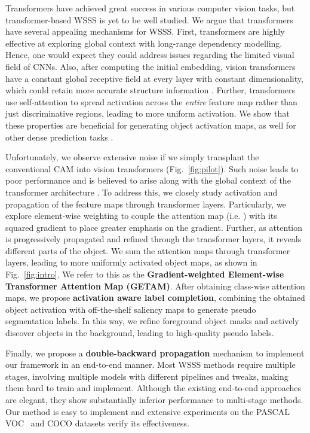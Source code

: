 \documentclass[10pt,twocolumn,letterpaper]{article}
\begin{document}
Transformers \cite{vaswani2017attention} have achieved great success in various computer vision tasks, but transformer-based WSSS is yet to be well studied.
We argue that transformers have several appealing mechanisms for WSSS. 
First, transformers are highly effective at exploring global context with long-range dependency modelling. Hence, one would expect they could address issues regarding the limited visual field of CNNs.
Also, after computing the initial embedding, vision transformers have a constant global receptive field at every layer 
with constant dimensionality, 
which could retain more accurate structure information \cite{ranftl2021vision,mao2021transformer}. Further, transformers use self-attention to spread activation across the \textit{entire} feature map rather than just discriminative regions, leading to more uniform activation.
We show that these properties are beneficial for generating object activation maps, as well for other dense prediction tasks \cite{ranftl2021vision,liu2021swin,bao2021beit,wang2021pvtv2,strudel2021segmenter}. 


Unfortunately, we observe extensive noise if we simply transplant the conventional CAM \cite{zhou2016learning} into vision transformers (Fig.~\ref{fig:pilot}). Such noise leads to poor performance and is
believed
to arise along with the global context of the transformer architecture \cite{zhang2021aggregating}.
To address this, we closely study activation and propagation of the feature maps through transformer layers. Particularly, we explore element-wise weighting to couple the attention map (i.e. ) with its squared gradient
to
place greater emphasis on the gradient. 
Further, as attention is progressively propagated and refined through the transformer layers, it reveals different  parts of the object.
We sum the attention maps through transformer layers, leading to more uniformly activated
object maps, as shown in Fig.~\ref{fig:intro}. We refer to this as the \textbf{Gradient-weighted Element-wise Transformer Attention Map (GETAM)}.
After obtaining class-wise attention maps,
we propose \textbf{activation aware label completion}, combining the obtained object activation with off-the-shelf saliency maps to generate pseudo segmentation labels. 
In this way, we refine foreground object masks and actively discover objects in the background, leading to high-quality pseudo labels.

Finally, we propose a \textbf{double-backward propagation} mechanism to implement our framework in an end-to-end manner. Most WSSS methods require multiple stages, involving multiple models with different pipelines and tweaks, making them hard to train and implement.
Although the existing end-to-end approaches
 \cite{pinheiro2015image,papandreou2015weakly,zeng2019joint,zhang2020reliability,Araslanov_2020_CVPR,zhang2021adaptive} 
 are elegant, they
show substantially inferior performance to multi-stage methods.
Our method is easy to implement and extensive experiments on the PASCAL VOC~\cite{everingham2010pascal}
and COCO \cite{lin2014microsoft} datasets verify its effectiveness.
\end{document}
